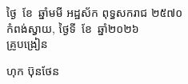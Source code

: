 \documentclass[a4paper,10pt]{article}
\begin{document}
\vspace{10pt}
\hfill
\begin{minipage}{9.8cm}
  {\centering
    ថ្ងៃ\makebox[16mm]{\dotfill}\ ខែ\makebox[18mm]{\dotfill}\ ឆ្នាំមមី អដ្ឋស័ក ពុទ្ធសករាជ ២៥៧០\\[2pt]
    កំពង់ស្វាយ, ថ្ងៃទី\makebox[10mm]{\dotfill}\ ខែ\makebox[18mm]{\dotfill}\ ឆ្នាំ២០២៦\\[3pt]
    {\muol គ្រូបង្រៀន}\par}
  \vspace{32pt}
  \hfill{\muol ហុក ប៊ុនថែន}\hspace*{1.4cm}
\end{minipage}
\end{document}
